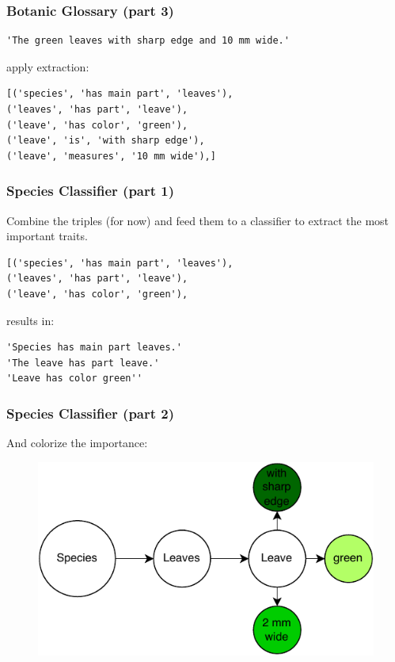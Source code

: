\documentclass{beamer}
\begin{document}
\begin{frame}[fragile]
\frametitle{Botanic Glossary (part 3)}
\begin{lstlisting}
'The green leaves with sharp edge and 10 mm wide.'
\end{lstlisting}
apply extraction:
\begin{lstlisting}
[('species', 'has main part', 'leaves'), 
('leaves', 'has part', 'leave'), 
('leave', 'has color', 'green'), 
('leave', 'is', 'with sharp edge'), 
('leave', 'measures', '10 mm wide'),]
\end{lstlisting}
\end{frame}



\begin{frame}[fragile]
\frametitle{Species Classifier (part 1)}
Combine the triples (for now) and feed them to a classifier to extract the most important traits.

\begin{lstlisting}
[('species', 'has main part', 'leaves'), 
('leaves', 'has part', 'leave'), 
('leave', 'has color', 'green'), 
\end{lstlisting}
results in:
\begin{lstlisting}
'Species has main part leaves.'
'The leave has part leave.'
'Leave has color green''
\end{lstlisting}
\end{frame}


\begin{frame}
\frametitle{Species Classifier (part 2)}
And colorize the importance:
\begin{figure} [htbp]
    \centering
    \includegraphics[width=\textwidth]{figures/plantnet_example_informationgraph.pdf}
\end{figure}
\end{frame}
\end{document}
